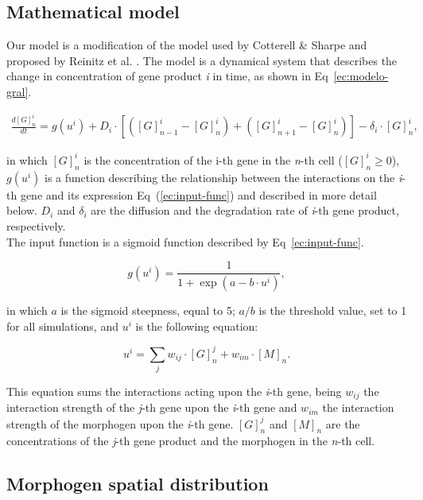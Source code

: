 \documentclass[10pt,letterpaper]{article}
\begin{document}
\subsection*{Mathematical model}

Our model is a modification of the model used by Cotterell \& Sharpe 
\cite{Cotterell2010} and proposed by Reinitz et al. \cite{Reinitz1995}. The 
model is a dynamical system that describes the change in concentration of gene 
product \emph{i} in time, as shown in Eq~\ref{ec:modelo-gral}.

 \begin{eqnarray}
  \frac{d[G]^i_n}{dt}
  = g(u^i) + D_i \cdot [ ([G]^i_{n-1}-[G]^i_n) +([G]^i_{n+1}-[G]^i_n)]-\delta_i 
  \cdot [ G ]^i_n ,
  \label{ec:modelo-gral}
 \end{eqnarray}

in which $[G]^{i}_{n}$ is the concentration of the i-th gene in the \emph{n}-th 
cell ($[G]^{i}_{n} ≥ 0$), $g(u^i)$ is a function describing the relationship 
between the interactions on the \emph{i}-th gene and its expression 
Eq~(\ref{ec:input-func}) and described in more detail below. $D_i$ and 
$\delta_i$ are the diffusion and the degradation rate of \emph{i}-th gene 
product, respectively.\\

The input function is a sigmoid function described by Eq~\ref{ec:input-func}.

\begin{equation}
 g(u^i) = \frac{1}{1 + \exp(a - b \cdot u^i)},
 \label{ec:input-func}
\end{equation}

in which $a$ is the sigmoid steepness, equal to 5; $a/b$ is the threshold value,
set to 1 for all simulations, and $u^i$ is the following equation:

\begin{equation}
 u^i = \sum_j w_{ij} \cdot [G]^j_n + w_{im} \cdot [M]_n.
 \label{ec:mat-sum}
\end{equation}

This equation sums the interactions acting upon the \emph{i}-th gene, being 
$w_{ij}$ the interaction strength of the \emph{j}-th gene upon the \emph{i}-th 
gene and $w_{im}$ the interaction strength of the morphogen upon the \emph{i}-th
gene. $[G]^j_n$ and $[M]_n$ are the concentrations of the \emph{j}-th gene 
product and the morphogen in the \emph{n}-th cell.

\subsection*{Morphogen spatial distribution}
\end{document}
